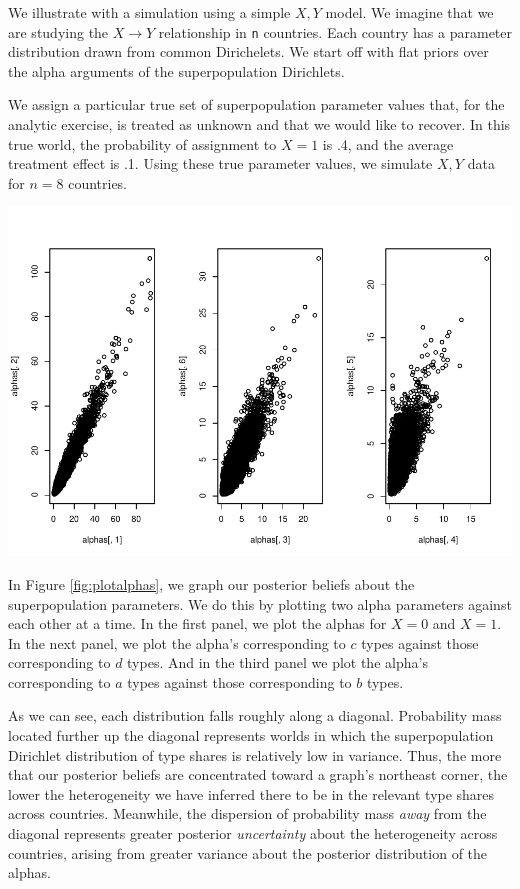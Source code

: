 \documentclass[
  12pt,
]{book}
\begin{document}
We illustrate with a simulation using a simple \(X,Y\) model. We imagine that we are studying the \(X \rightarrow Y\) relationship in \texttt{n} countries. Each country has a parameter distribution drawn from common Dirichelets. We start off with flat priors over the alpha arguments of the superpopulation Dirichlets.

We assign a particular true set of superpopulation parameter values that, for the analytic exercise, is treated as unknown and that we would like to recover. In this true world, the probability of assignment to \(X=1\) is .4, and the average treatment effect is .1. Using these true parameter values, we simulate \(X, Y\) data for \(n=8\) countries.

\includegraphics{ii_files/figure-latex/plotalphas-1.pdf}

In Figure \ref{fig:plotalphas}, we graph our posterior beliefs about the superpopulation parameters. We do this by plotting two alpha parameters against each other at a time. In the first panel, we plot the alphas for \(X=0\) and \(X=1\). In the next panel, we plot the alpha's corresponding to \(c\) types against those corresponding to \(d\) types. And in the third panel we plot the alpha's corresponding to \(a\) types against those corresponding to \(b\) types.

As we can see, each distribution falls roughly along a diagonal. Probability mass located further up the diagonal represents worlds in which the superpopulation Dirichlet distribution of type shares is relatively low in variance. Thus, the more that our posterior beliefs are concentrated toward a graph's northeast corner, the lower the heterogeneity we have inferred there to be in the relevant type shares across countries. Meanwhile, the dispersion of probability mass \emph{away} from the diagonal represents greater posterior \emph{uncertainty} about the heterogeneity across countries, arising from greater variance about the posterior distribution of the alphas.
\end{document}
